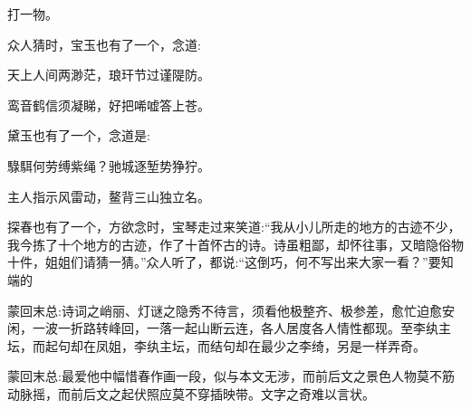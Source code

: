 \begin{parag}
    打一物。
\end{parag}


\begin{parag}
    众人猜时，宝玉也有了一个，念道:
\end{parag}


\begin{poem}
    \begin{pl}天上人间两渺茫，琅玕节过谨隄防。\end{pl}

    \begin{pl}鸾音鹤信须凝睇，好把唏嘘答上苍。\end{pl}

\end{poem}


\begin{parag}
    黛玉也有了一个，念道是:
\end{parag}


\begin{poem}
    \begin{pl}騄駬何劳缚紫绳？驰城逐堑势狰狞。\end{pl}

    \begin{pl}主人指示风雷动，鳌背三山独立名。\end{pl}

\end{poem}


\begin{parag}
    探春也有了一个，方欲念时，宝琴走过来笑道:“我从小儿所走的地方的古迹不少，我今拣了十个地方的古迹，作了十首怀古的诗。诗虽粗鄙，却怀往事，又暗隐俗物十件，姐姐们请猜一猜。”众人听了，都说:“这倒巧，何不写出来大家一看？”要知端的
\end{parag}


\begin{parag}
    \begin{note}蒙回末总:诗词之峭丽、灯谜之隐秀不待言，须看他极整齐、极参差，愈忙迫愈安闲，一波一折路转峰回，一落一起山断云连，各人居度各人情性都现。至李纨主坛，而起句却在凤姐，李纨主坛，而结句却在最少之李绮，另是一样弄奇。\end{note}
\end{parag}


\begin{parag}
    \begin{note}蒙回末总:最爱他中幅惜春作画一段，似与本文无涉，而前后文之景色人物莫不筋动脉摇，而前后文之起伏照应莫不穿插映带。文字之奇难以言状。\end{note}
\end{parag}

